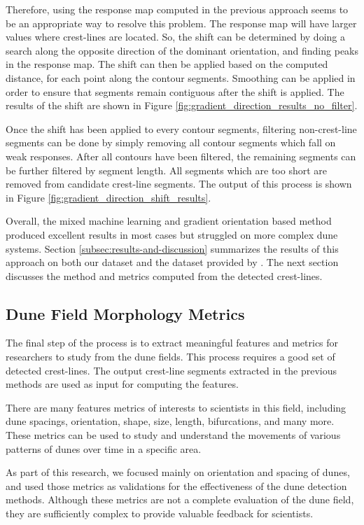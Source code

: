 Therefore, using the response map computed in the previous approach seems to be an appropriate way to resolve this problem. The response map will have larger values where crest-lines are located. So, the shift can be determined by doing a search along the opposite direction of the dominant orientation, and finding peaks in the response map. The shift can then be applied based on the computed distance, for each point along the contour segments. Smoothing can be applied in order to ensure that segments remain contiguous after the shift is applied. The results of the shift are shown in Figure \ref{fig:gradient_direction_results_no_filter}.

Once the shift has been applied to every contour segments, filtering non-crest-line segments can be done by simply removing all contour segments which fall on weak responses. After all contours have been filtered, the remaining segments can be further filtered by segment length. All segments which are too short are removed from candidate crest-line segments. The output of this process is shown in Figure \ref{fig:gradient_direction_shift_results}.

Overall, the mixed machine learning and gradient orientation based method produced excellent results in most cases but struggled on more complex dune systems. Section \ref{subsec:results-and-discussion} summarizes the results of this approach on both our dataset and the dataset provided by \cite{vaz_object_based_dune_analysis}. The next section discusses the method and metrics computed from the detected crest-lines.


\subsection{Dune Field Morphology Metrics} \label{subsec:dune-field-metrics}
The final step of the process is to extract meaningful features and metrics for researchers to study from the dune fields. This process requires a good set of detected crest-lines. The output crest-line segments extracted in the previous methods are used as input for computing the features.

There are many features metrics of interests to scientists in this field, including dune spacings, orientation, shape, size, length, bifurcations, and many more. These metrics can be used to study and understand the movements of various patterns of dunes over time in a specific area.

As part of this research, we focused mainly on orientation and spacing of dunes, and used those metrics as validations for the effectiveness of the dune detection methods. Although these metrics are not a complete evaluation of the dune field, they are sufficiently complex to provide valuable feedback for scientists.

